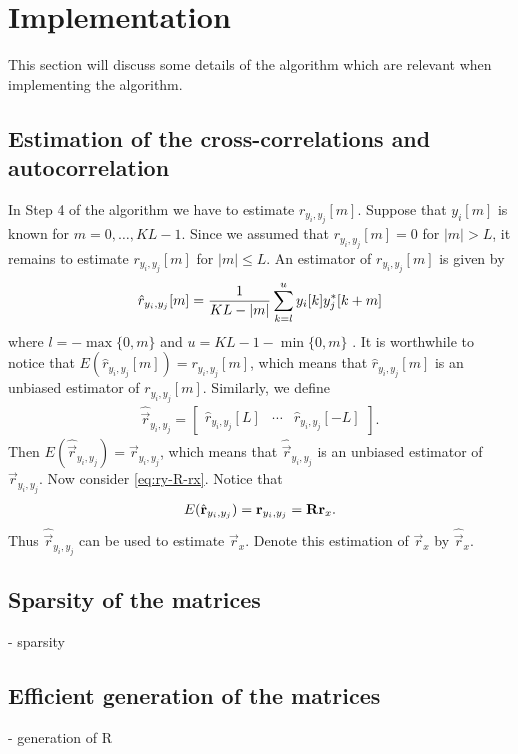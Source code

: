 \documentclass[a4paper, openany, oneside]{memoir}
\begin{document}
\section{Implementation}
\label{sec:reconstruction-implementation}
This section will discuss some details of the algorithm which are relevant when implementing the algorithm.

\subsection{Estimation of the cross-correlations and autocorrelation}
\label{sub:reconstruction-estimation}
In Step 4 of the algorithm we have to estimate $r_{y_i,y_j}[m]$. Suppose that $y_i[m]$ is known for $m = 0,\ldots,KL-1$. Since we assumed that $r_{y_i,y_j}[m]=0$ for $|m|>L$, it remains to estimate $r_{y_i,y_j}[m]$ for $|m| \le L$. An estimator of $r_{y_i,y_j}[m]$ is given by
\begin{align*}
    \hat{r}_{y_i,y_j}[m] = \frac{1}{KL-|m|}\sum_{k=l}^{u}y_i[k]y^*_j[k+m]
\end{align*}
where $l=-\max\{0,m\}$ and $u=KL-1-\min\{0,m\}$ \cite{hayes1996statistical}. It is worthwhile to notice that $E(\hat{r}_{y_i,y_j}[m])=r_{y_i,y_j}[m]$, which means that $\hat{r}_{y_i,y_j}[m]$ is an unbiased estimator of $r_{y_i,y_j}[m]$. Similarly, we define
\begin{align*}
    \hat{\vec{r}}_{y_i,y_j} = \begin{bmatrix}
        \hat{r}_{y_i,y_j}[L] & \cdots & \hat{r}_{y_i,y_j}[-L]
    \end{bmatrix}.
\end{align*}
Then $E(\hat{\vec{r}}_{y_i,y_j})=\vec{r}_{y_i,y_j}$, which means that $\hat{\vec{r}}_{y_i,y_j}$ is an unbiased estimator of $\vec{r}_{y_i,y_j}$. Now consider \cref{eq:ry-R-rx}. Notice that
\begin{align*}
    E(\hat{\boldsymbol{\mathbf{r}}}_{y_i,y_j}) = \boldsymbol{\mathbf{r}}_{y_i,y_j} = \boldsymbol{\mathbf{R}} \boldsymbol{\mathbf{r}}_x.
\end{align*}
Thus $\hat{\vec{r}}_{y_i,y_j}$ can be used to estimate $\vec{r}_x$. Denote this estimation of $\vec{r}_x$ by $\hat{\vec{r}}_x$.

\subsection{Sparsity of the matrices}
\label{sub:reconstruction-sparsity}
- sparsity 

\subsection{Efficient generation of the matrices}
\label{sub:reconstruction-generation}
- generation of R
\end{document}
